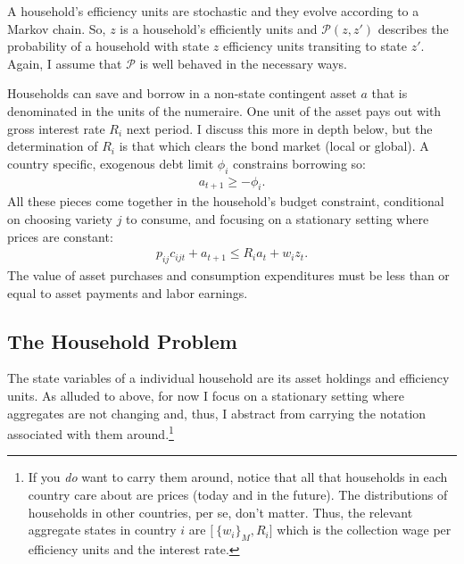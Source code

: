 \documentclass[12pt,pdftex]{article}
\begin{document}
\begin{onehalfspacing}
A household's efficiency units are stochastic and they evolve according to a Markov chain. So, $z$ is a household's efficiently units and $\mathcal{P}(z,z')$ describes the probability of a household with state $z$ efficiency units transiting to state $z'$. Again, I assume that $\mathcal{P}$ is well behaved in the necessary ways.

Households can save and borrow in a non-state contingent asset $a$ that is denominated in the units of the numeraire. One unit of the asset pays out with gross interest rate $R_i$ next period. I discuss this more in depth below, but the determination of $R_{i}$ is that which clears the bond market (local or global). A country specific, exogenous debt limit $\phi_{i}$ constrains borrowing so:
\begin{align}
a_{t+1} \geq - \phi_{i}.
\label{eq:borrowing-constraint}
\end{align}
All these pieces come together in the household's budget constraint, conditional on choosing variety $j$ to consume, and focusing on a stationary setting where prices are constant:
\begin{align}
p_{ij}c_{ijt} +  a_{t+1} \leq    R_{i} a_{t} + w_{i} z_{t}.\label{eq:trade-budget-constraint}
\end{align}
The value of asset purchases and consumption expenditures must be less than or equal to asset payments and labor earnings.

\subsection{The Household Problem}

The state variables of a individual household are its asset holdings and efficiency units. As alluded to above, for now I focus on a stationary setting where aggregates are not changing and, thus, I abstract from carrying the notation associated with them around.\footnote{If you \emph{do} want to carry them around, notice that all that households in each country care about are prices (today and in the future). The distributions of households in other countries, per se, don't matter. Thus, the relevant aggregate states in country $i$ are $\big [ \ \{ w_i \}_{M}, R_i \big ]$ which is the collection wage per efficiency units and the interest rate.}


\end{onehalfspacing}
\end{document}
